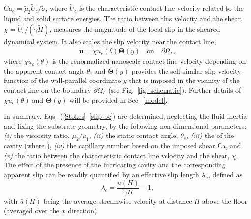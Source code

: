 Ca$_c=\tilde{\mu}_2 \tilde{U}_c/\tilde{\sigma}$, where $\tilde{U}_c$ is the characteristic contact line velocity related to the liquid and solid surface energies. The ratio between this velocity and the shear, $\chi=\tilde{U}_c/ (\dot{\tilde{\gamma}} \tilde{H})$, measures the magnitude of the local slip in the sheared dynamical system. It also scales the slip velocity near the contact line,
\begin{equation} \label{slip bc}
  \begin{aligned}
    {\bm u} = \chi u_c (\theta) {\bm \Theta} (y) \quad \textrm{on} \quad \partial \Omega_\Gamma,
  \end{aligned}
\end{equation}
where $\chi u_c(\theta)$ is the renormalized nanoscale contact line velocity depending on the apparent contact angle $\theta$, and ${\bm \Theta}(y)$ provides the self-similar slip velocity function of the wall-parallel coordinate $y$ that is imposed in the vicinity of the contact line on the boundary $\partial \Omega_\Gamma$ (see Fig.\ \ref{fig: schematic}). Further details of $\chi u_c(\theta)$ and ${\bm \Theta}(y)$ will be provided in Sec.\ \ref{model}.%

In summary, Eqs.\ (\ref{Stokes}--\ref{slip bc}) are determined, neglecting the fluid inertia and fixing the substrate geometry, by the following non-dimensional parameters: 
\textit{(i)} the viscosity ratio, $\tilde{\mu}_2/\tilde{\mu}_1$, 
\textit{(ii)} the static contact angle, $\theta_s$, 
\textit{(iii)} the  of the cavity  (where ),
\textit{(iv)} the capillary number based on the imposed shear Ca, and
\textit{(v)} the ratio between the characteristic contact line velocity and the shear, $\chi$.
The effect of the presence of the lubricating cavity and the corresponding apparent slip can be readily quantified by an effective slip length $\lambda_e$, defined as
\begin{equation} \label{eff slip}
  \lambda_e = \frac{\bar{u}(H)}{\dot{\gamma}H}-1,
\end{equation}
with $\bar{u}(H)$ being the average streamwise velocity at distance $H$ above the floor (averaged over the $x$ direction).

